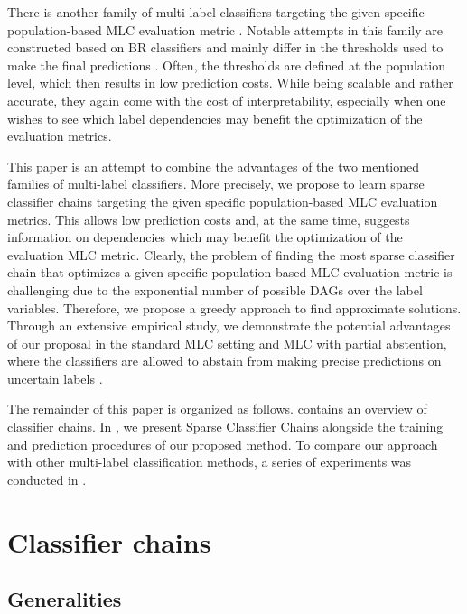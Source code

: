 \documentclass[a4paper,fleqn]{cas-sc}
\begin{document}
There is another family of multi-label classifiers targeting the given specific population-based MLC evaluation metric \citep{pillai2017designing, zhang2018binary}. Notable attempts in this family are constructed based on BR classifiers and mainly differ in the thresholds used to make the final predictions \citep{pillai2017designing, zhang2018binary}. Often, the thresholds are defined at the population level, which then results in low prediction costs.  While being scalable and rather accurate, they again come with the cost of interpretability, especially when one wishes to see which label dependencies may benefit the optimization of the evaluation metrics.      

This paper is an attempt to combine the advantages of the two mentioned families of multi-label classifiers. More precisely, we propose to learn sparse classifier chains targeting the given specific population-based MLC evaluation metrics. This allows low prediction costs and, at the same time, suggests information on dependencies which may benefit the optimization of the evaluation MLC metric. Clearly, the problem of finding the most sparse classifier chain that optimizes a given specific population-based MLC evaluation metric is challenging due to the exponential number of possible DAGs over the label variables. Therefore, we propose a greedy approach to find approximate solutions. Through an extensive empirical study, we demonstrate the potential advantages of our proposal in the standard MLC setting and MLC with partial abstention, where the classifiers are allowed to abstain from making precise predictions on uncertain labels \citep{nguyen2021multilabel,nguyen2026robust}. 

The remainder of this paper is organized as follows.  contains an overview of classifier chains. In , we present Sparse Classifier Chains alongside the training and prediction procedures of our proposed method. To compare our approach with other multi-label classification methods, a series of experiments was conducted in .

\section{Classifier chains}\label{sec:Classifier chains}

\subsection{Generalities}\label{subsec:cc-generalities}
\end{document}
